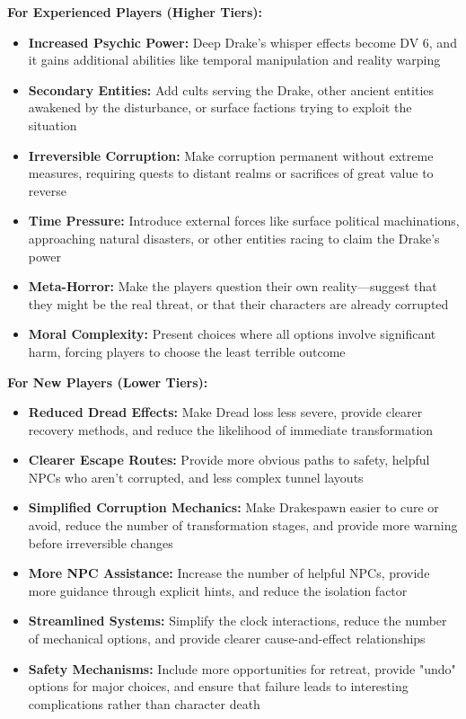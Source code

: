 \documentclass[11pt]{article}
\begin{document}
\textbf{For Experienced Players (Higher Tiers):}
\begin{itemize}
\item \textbf{Increased Psychic Power:} Deep Drake's whisper effects become DV 6, and it gains additional abilities like temporal manipulation and reality warping
\item \textbf{Secondary Entities:} Add cults serving the Drake, other ancient entities awakened by the disturbance, or surface factions trying to exploit the situation
\item \textbf{Irreversible Corruption:} Make corruption permanent without extreme measures, requiring quests to distant realms or sacrifices of great value to reverse
\item \textbf{Time Pressure:} Introduce external forces like surface political machinations, approaching natural disasters, or other entities racing to claim the Drake's power
\item \textbf{Meta-Horror:} Make the players question their own reality—suggest that they might be the real threat, or that their characters are already corrupted
\item \textbf{Moral Complexity:} Present choices where all options involve significant harm, forcing players to choose the least terrible outcome
\end{itemize}

\textbf{For New Players (Lower Tiers):}
\begin{itemize}
\item \textbf{Reduced Dread Effects:} Make Dread loss less severe, provide clearer recovery methods, and reduce the likelihood of immediate transformation
\item \textbf{Clearer Escape Routes:} Provide more obvious paths to safety, helpful NPCs who aren't corrupted, and less complex tunnel layouts
\item \textbf{Simplified Corruption Mechanics:} Make Drakespawn easier to cure or avoid, reduce the number of transformation stages, and provide more warning before irreversible changes
\item \textbf{More NPC Assistance:} Increase the number of helpful NPCs, provide more guidance through explicit hints, and reduce the isolation factor
\item \textbf{Streamlined Systems:} Simplify the clock interactions, reduce the number of mechanical options, and provide clearer cause-and-effect relationships
\item \textbf{Safety Mechanisms:} Include more opportunities for retreat, provide "undo" options for major choices, and ensure that failure leads to interesting complications rather than character death
\end{itemize}
\end{document}
